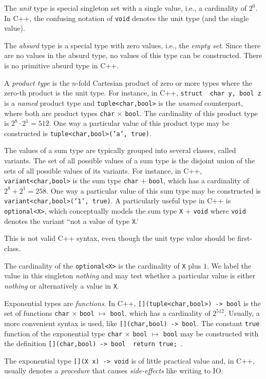 \documentclass[ ../main.tex]{subfiles}
\begin{document}
	The \emph{unit} type is special singleton set with a single value, i.e., a cardinality of $2^0$.
	In C++, the confusing notation of \texttt{void} denotes the unit type (and the single value).
	\begin{remark}
		The \emph{absurd} type is a special type with zero values, i.e., the \emph{empty set}.
		Since there are no values in the absurd type, no values of this type can be constructed.
		There is no primitive absurd type in C++.
	\end{remark}
	
	A \emph{product type} is the $n$-fold Cartesian product of zero or more types where the zero-th product is the unit type.
	For instance, in C++, \texttt{struct { char y, bool z }} is a \emph{named} product type and \texttt{tuple<char,bool>}
	is the \emph{unamed} counterpart, where both are product types \texttt{char} $\times$ \texttt{bool}.
	The cardinality of this product type is $2^8 \cdot 2^1 = 512$.
	One way a particular value of this product type may be constructed is \texttt{tuple<char,bool>('a', true)}.
	
	The values of a sum type are typically grouped into several classes, called variants.
	The set of all possible values of a sum type is the disjoint union of the sets of all possible values of its variants.
	For instance, in C++, \texttt{variant<char,bool>}
	is the sum type \texttt{char} $+$ \texttt{bool}, which has a cardinality of $2^8 + 2^1 = 258$.
	One way a particular value of this sum type may be constructed is \texttt{variant<char,bool>('1', true)}.
	A particularly useful type in C++ is \texttt{optional<X>}, which conceptually models the sum type \texttt{X} + \texttt{void} where \texttt{void} denotes the variant ``not a value of type \texttt{X}.'
	\begin{remark}
		This is not valid C++ syntax, even though the unit type value should be first-class.
	\end{remark}
	The cardinality of the \texttt{optional<X>} is the cardinality of \texttt{X} plus $1$.
	We label the value in this singleton \emph{nothing} and may test whether a particular value is either \emph{nothing} or alternatively a value in \texttt{X}.
	
	Exponential types are \emph{functions}.
	In C++, \texttt{[](tuple<char,bool>) -> bool} is the set of functions \texttt{char} $\times$ \texttt{bool} $\mapsto$ \texttt{bool}, which has a cardinality of $2^{512}$.
	Usually, a more convenient syntax is used, like \texttt{[](char,bool) -> bool}.
	The constant \texttt{true} function of the exponential type \texttt{char} $\times$ \texttt{bool} $\mapsto$ \texttt{bool} may be constructed with the definition \texttt{[](char,bool) -> bool { return true; }}.
	\begin{remark}
		The exponential type \texttt{[](X x) -> void} is of little practical value and, in C++, usually denotes a \emph{procedure} that causes \emph{side-effects} like writing to IO.
	\end{remark}
	
\end{document}
